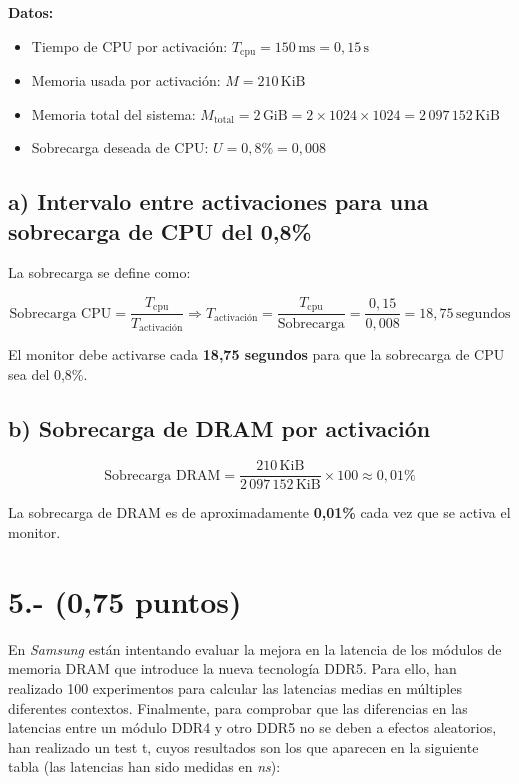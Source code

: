 \documentclass[a4paper,12pt]{article}
\begin{document}
\textbf{Datos:}
\begin{itemize}
    \item Tiempo de CPU por activación: $T_{\text{cpu}} = 150 \, \text{ms} = 0{,}15 \, \text{s}$
    \item Memoria usada por activación: $M = 210 \, \text{KiB}$
    \item Memoria total del sistema: $M_{\text{total}} = 2 \, \text{GiB} = 2 \times 1024 \times 1024 = 2\,097\,152 \, \text{KiB}$
    \item Sobrecarga deseada de CPU: $U = 0{,}8\% = 0{,}008$
\end{itemize}

\subsection*{a) Intervalo entre activaciones para una sobrecarga de CPU del 0,8\%}

La sobrecarga se define como:

\[
\text{Sobrecarga CPU} = \frac{T_{\text{cpu}}}{T_{\text{activación}}}
\Rightarrow
T_{\text{activación}} = \frac{T_{\text{cpu}}}{\text{Sobrecarga}}
= \frac{0{,}15}{0{,}008} = 18{,}75 \, \text{segundos}
\]

El monitor debe activarse cada \textbf{18,75 segundos} para que la sobrecarga de CPU sea del 0,8\%.

\subsection*{b) Sobrecarga de DRAM por activación}

\[
\text{Sobrecarga DRAM} = \frac{210 \, \text{KiB}}{2\,097\,152 \, \text{KiB}} \times 100
\approx 0{,}01\%
\]

La sobrecarga de DRAM es de aproximadamente \textbf{0,01\%} cada vez que se activa el monitor.

\section*{5.- (0,75 puntos)}
En \textit{Samsung} están intentando evaluar la mejora en la latencia de los módulos de memoria DRAM que introduce la nueva tecnología DDR5. Para ello, han realizado 100 experimentos para calcular las latencias medias en múltiples diferentes contextos. Finalmente, para comprobar que las diferencias en las latencias entre un módulo DDR4 y otro DDR5 no se deben a efectos aleatorios, han realizado un test t, cuyos resultados son los que aparecen en la siguiente tabla (las latencias han sido medidas en \textit{ns}):\\
\end{document}
